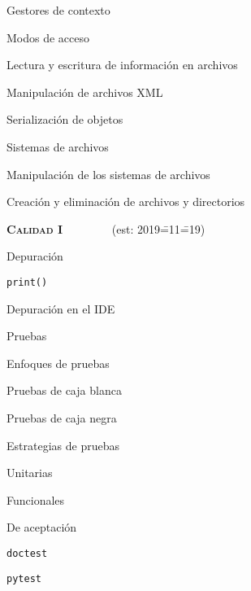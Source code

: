 \begin{longenum}
\begin{longenum}
\begin{longenum}
            \item Gestores de contexto
            \item Modos de acceso
            \item Lectura y escritura de información en archivos
        \end{longenum}
        \item Manipulación de archivos XML
        \item Serialización de objetos
        \item Sistemas de archivos
        \begin{longenum}
            \item Manipulación de los sistemas de archivos
            \item Creación y eliminación de archivos y directorios
        \end{longenum}
    \end{longenum}
    \item \textbf{\textsc{Calidad I}} \ \ \ \ \ \ \ \ (est: 2019\==11\==19)
    \begin{longenum}
        \item Depuración
        \begin{longenum}
            \item \texttt{print()}
            \item Depuración en el IDE
        \end{longenum}
        \item Pruebas
        \begin{longenum}
            \item Enfoques de pruebas
            \begin{longenum}
                \item Pruebas de caja blanca
                \item Pruebas de caja negra
            \end{longenum}
            \item Estrategias de pruebas
            \begin{longenum}
                \item Unitarias
                \item Funcionales
                \item De aceptación
            \end{longenum}
            \item \texttt{doctest}
            \item \texttt{pytest}

\end{longenum}
\end{longenum}
\end{longenum}
